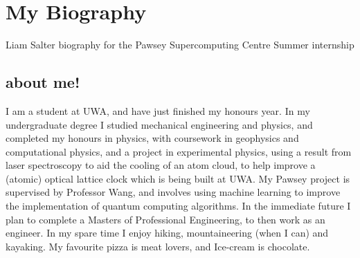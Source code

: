 \section{My Biography}
Liam Salter biography for the Pawsey Supercomputing Centre Summer internship
\subsection{about me!}
I am a student at UWA, and have just finished my honours year.  In my undergraduate degree I studied mechanical engineering and physics, and completed my honours in physics, with coursework in geophysics and computational physics, and a project in experimental physics, using a result from laser spectroscopy to aid the cooling of an atom cloud, to help improve a (atomic) optical lattice clock which is being built at UWA.  My Pawsey project is supervised by Professor Wang, and involves using machine learning to improve the implementation of quantum computing algorithms.  In the immediate future I plan to complete a Masters of Professional Engineering, to then work as an engineer.  In my spare time I enjoy hiking, mountaineering (when I can) and kayaking.  My favourite pizza is meat lovers, and Ice-cream is chocolate. 
